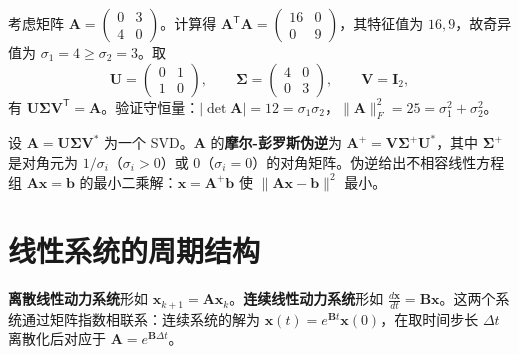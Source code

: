 \begin{example}\label{ch5_example_svd_2x2}
考虑矩阵 $\mathbf{A} = \begin{pmatrix} 0 & 3 \\ 4 & 0 \end{pmatrix}$。计算得 $\mathbf{A}^{\mathsf T}\mathbf{A} = \begin{pmatrix} 16 & 0 \\ 0 & 9 \end{pmatrix}$，其特征值为 $16, 9$，故奇异值为 $\sigma_1 = 4 \ge \sigma_2 = 3$。取
\[
\mathbf{U} = \begin{pmatrix} 0 & 1 \\ 1 & 0 \end{pmatrix}, \qquad \boldsymbol{\Sigma} = \begin{pmatrix} 4 & 0 \\ 0 & 3 \end{pmatrix}, \qquad \mathbf{V} = \mathbf{I}_2,
\]
有 $\mathbf{U}\boldsymbol{\Sigma}\mathbf{V}^{\mathsf T} = \mathbf{A}$。验证守恒量：$|\det\mathbf{A}| = 12 = \sigma_1\sigma_2$，$\|\mathbf{A}\|_F^2 = 25 = \sigma_1^2 + \sigma_2^2$。
\end{example}

\begin{definition}[伪逆与最小二乘]\label{def:pseudoinverse}
设 $\mathbf{A} = \mathbf{U} \boldsymbol{\Sigma} \mathbf{V}^*$ 为一个 SVD。$\mathbf{A}$ 的\textbf{摩尔-彭罗斯伪逆}为 $\mathbf{A}^+ = \mathbf{V} \boldsymbol{\Sigma}^+ \mathbf{U}^*$，其中 $\boldsymbol{\Sigma}^+$ 是对角元为 $1/\sigma_i$（$\sigma_i > 0$）或 $0$（$\sigma_i = 0$）的对角矩阵。伪逆给出不相容线性方程组 $\mathbf{A}\mathbf{x} = \mathbf{b}$ 的最小二乘解：$\mathbf{x} = \mathbf{A}^+ \mathbf{b}$ 使 $\|\mathbf{A}\mathbf{x} - \mathbf{b}\|^2$ 最小。
\end{definition}

\section{\texorpdfstring{线性系统的周期结构}{线性系统的周期结构}}

\begin{definition}[线性动力系统]\label{def:linear_dynamical_system}
\textbf{离散线性动力系统}形如 $\mathbf{x}_{k+1} = \mathbf{A} \mathbf{x}_k$。\textbf{连续线性动力系统}形如 $\frac{d\mathbf{x}}{dt} = \mathbf{B} \mathbf{x}$。这两个系统通过矩阵指数相联系：连续系统的解为 $\mathbf{x}(t) = e^{\mathbf{B}t} \mathbf{x}(0)$，在取时间步长 $\Delta t$ 离散化后对应于 $\mathbf{A} = e^{\mathbf{B}\Delta t}$。
\end{definition}


